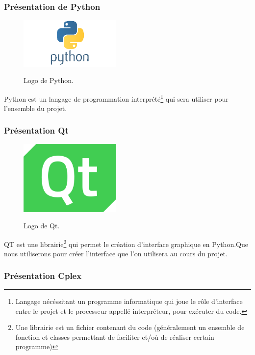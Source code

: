 \subsubsection{Présentation de Python}

\begin{figure}[h]
  \begin{center}
  \includegraphics[width=5cm]{./images/Python_Logo.png}\label{Python}
  \caption{Logo de Python.}
  \end{center}
\end{figure}

Python est un langage de programmation interprété\footnote{\label{interprete}Langage nécéssitant un programme informatique qui joue le rôle d’interface entre le projet et le processeur appellé interpréteur, pour exécuter du code.} qui sera utiliser pour l'ensemble du projet.

\subsubsection{Présentation Qt}

\begin{figure}[h]
  \begin{center}
  \includegraphics[width=5cm]{./images/Qt_logo_2016.png}\label{Qt}
  \caption{Logo de Qt.}
  \end{center}
\end{figure}

QT est une librairie\footnote{\label{librairie}Une librairie est un fichier contenant du code (généralement un ensemble de fonction et classes permettant de faciliter et/où de réaliser certain programme)} qui permet le création d'interface graphique en Python.Que nous utiliserons pour créer l'interface que l'on utilisera au cours du projet.

\subsubsection{Présentation Cplex}

